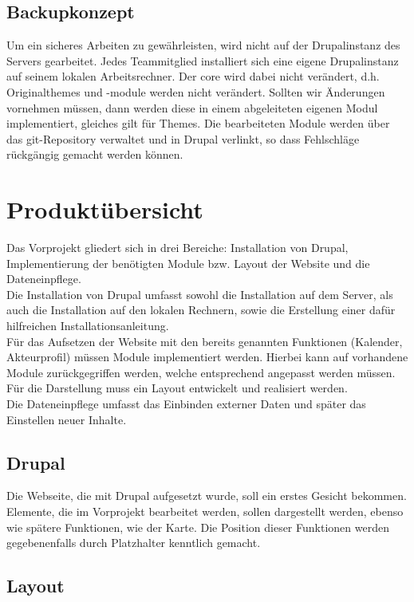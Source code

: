\documentclass{swp}
\begin{document}
\subsection{Backupkonzept}
Um ein sicheres Arbeiten zu gew\"ahrleisten, wird nicht auf der Drupalinstanz des Servers gearbeitet. Jedes Teammitglied installiert sich eine eigene Drupalinstanz auf seinem lokalen Arbeitsrechner. Der \glqq core\grqq{} wird dabei nicht ver\"andert, d.h. Originalthemes und -module werden nicht ver\"andert. Sollten wir \"Anderungen vornehmen m\"ussen, dann werden diese in einem abgeleiteten eigenen Modul implementiert, gleiches gilt f\"ur Themes. Die bearbeiteten Module werden \"uber das git-Repository verwaltet und in Drupal verlinkt, so dass Fehlschl\"age r\"uckg\"angig gemacht werden k\"onnen.

\section{Produkt\"ubersicht}
Das Vorprojekt gliedert sich in drei Bereiche: Installation von Drupal, Implementierung der ben\"otigten Module bzw. Layout der Website und die Dateneinpflege.\\ 
Die Installation von Drupal umfasst sowohl die Installation auf dem Server, als auch die Installation auf den lokalen Rechnern, sowie die Erstellung einer daf\"ur hilfreichen Installationsanleitung.\\
F\"ur das Aufsetzen der Website mit den bereits genannten Funktionen (Kalender, Akteurprofil) m\"ussen Module implementiert werden. Hierbei kann auf vorhandene Module zur\"uckgegriffen werden, welche entsprechend angepasst werden m\"ussen. F\"ur die Darstellung muss ein Layout entwickelt und realisiert werden.\\
Die Dateneinpflege umfasst das Einbinden externer Daten und sp\"ater das Einstellen neuer Inhalte.

\subsection{Drupal}
Die Webseite, die mit Drupal aufgesetzt wurde, soll ein erstes Gesicht bekommen. Elemente, die im Vorprojekt bearbeitet werden, sollen dargestellt werden, ebenso wie sp\"atere Funktionen, wie der Karte. Die Position dieser Funktionen werden gegebenenfalls durch Platzhalter kenntlich gemacht.

\subsection{Layout}
\end{document}
